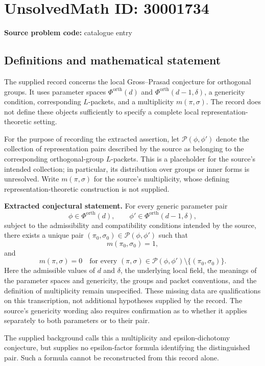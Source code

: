 \documentclass[11pt]{article}
\begin{document}
\section*{UnsolvedMath ID: 30001734}
\textbf{Source problem code:} catalogue entry
\subsection{Definitions and mathematical statement}
The supplied record concerns the local Gross--Prasad conjecture for orthogonal groups. It uses parameter spaces \(\Phi^{\mathrm{orth}}(d)\) and \(\Phi^{\mathrm{orth}}(d-1,\delta)\), a genericity condition, corresponding \(L\)-packets, and a multiplicity \(m(\pi,\sigma)\). The record does not define these objects sufficiently to specify a complete local representation-theoretic setting.

For the purpose of recording the extracted assertion, let \(\mathcal P(\phi,\phi')\) denote the collection of representation pairs described by the source as belonging to the corresponding orthogonal-group \(L\)-packets. This is a placeholder for the source's intended collection; in particular, its distribution over groups or inner forms is unresolved. Write \(m(\pi,\sigma)\) for the source's multiplicity, whose defining representation-theoretic construction is not supplied.

\textbf{Extracted conjectural statement.} For every generic parameter pair
\[
\phi\in\Phi^{\mathrm{orth}}(d),\qquad
\phi'\in\Phi^{\mathrm{orth}}(d-1,\delta),
\]
subject to the admissibility and compatibility conditions intended by the source, there exists a unique pair \((\pi_0,\sigma_0)\in\mathcal P(\phi,\phi')\) such that
\[
m(\pi_0,\sigma_0)=1,
\]
and
\[
m(\pi,\sigma)=0
\quad\text{for every }(\pi,\sigma)\in\mathcal P(\phi,\phi')
\setminus\{(\pi_0,\sigma_0)\}.
\]
Here the admissible values of \(d\) and \(\delta\), the underlying local field, the meanings of the parameter spaces and genericity, the groups and packet conventions, and the definition of multiplicity remain unspecified. These missing data are qualifications on this transcription, not additional hypotheses supplied by the record. The source's genericity wording also requires confirmation as to whether it applies separately to both parameters or to their pair.

The supplied background calls this a multiplicity and epsilon-dichotomy conjecture, but supplies no epsilon-factor formula identifying the distinguished pair. Such a formula cannot be reconstructed from this record alone.
\end{document}
